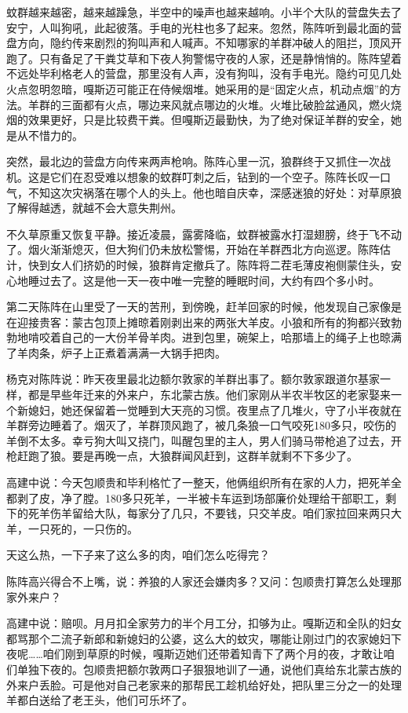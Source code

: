 \par 蚊群越来越密，越来越躁急，半空中的噪声也越来越响。小半个大队的营盘失去了安宁，人叫狗吼，此起彼落。手电的光柱也多了起来。忽然，陈阵听到最北面的营盘方向，隐约传来剧烈的狗叫声和人喊声。不知哪家的羊群冲破人的阻拦，顶风开跑了。只有备足了干粪艾草和下夜人狗警惕守夜的人家，还是静悄悄的。陈阵望着不远处毕利格老人的营盘，那里没有人声，没有狗叫，没有手电光。隐约可见几处火点忽明忽暗，嘎斯迈可能正在侍候烟堆。她采用的是“固定火点，机动点烟”的方法。羊群的三面都有火点，哪边来风就点哪边的火堆。火堆比破脸盆通风，燃火烧烟的效果更好，只是比较费干粪。但嘎斯迈最勤快，为了绝对保证羊群的安全，她是从不惜力的。
\par 突然，最北边的营盘方向传来两声枪响。陈阵心里一沉，狼群终于又抓住一次战机。这是它们在忍受难以想象的蚊群叮刺之后，钻到的一个空子。陈阵长叹一口气，不知这次灾祸落在哪个人的头上。他也暗自庆幸，深感迷狼的好处：对草原狼了解得越透，就越不会大意失荆州。
\par 不久草原重又恢复平静。接近凌晨，露雾降临，蚊群被露水打湿翅膀，终于飞不动了。烟火渐渐熄灭，但大狗们仍未放松警惕，开始在羊群西北方向巡逻。陈阵估计，快到女人们挤奶的时候，狼群肯定撤兵了。陈阵将二茬毛薄皮袍侧蒙住头，安心地睡过去了。这是他一天一夜中唯一完整的睡眠时间，大约有四个多小时。
\par 
\par 第二天陈阵在山里受了一天的苦刑，到傍晚，赶羊回家的时候，他发现自己家像是在迎接贵客：蒙古包顶上摊晾着刚剥出来的两张大羊皮。小狼和所有的狗都兴致勃勃地啃咬着自己的一大份羊骨羊肉。进到包里，碗架上，哈那墙上的绳子上也晾满了羊肉条，炉子上正煮着满满一大锅手把肉。
\par 杨克对陈阵说：昨天夜里最北边额尔敦家的羊群出事了。额尔敦家跟道尔基家一样，都是早些年迁来的外来户，东北蒙古族。他们家刚从半农半牧区的老家娶来一个新媳妇，她还保留着一觉睡到大天亮的习惯。夜里点了几堆火，守了小半夜就在羊群旁边睡着了。烟灭了，羊群顶风跑了，被几条狼一口气咬死180多只，咬伤的羊倒不太多。幸亏狗大叫又挠门，叫醒包里的主人，男人们骑马带枪追了过去，开枪赶跑了狼。要是再晚一点，大狼群闻风赶到，这群羊就剩不下多少了。
\par 高建中说：今天包顺贵和毕利格忙了一整天，他俩组织所有在家的人力，把死羊全都剥了皮，净了膛。180多只死羊，一半被卡车运到场部廉价处理给干部职工，剩下的死羊伤羊留给大队，每家分了几只，不要钱，只交羊皮。咱们家拉回来两只大羊，一只死的，一只伤的。
\par 天这么热，一下子来了这么多的肉，咱们怎么吃得完？
\par 陈阵高兴得合不上嘴，说：养狼的人家还会嫌肉多？又问：包顺贵打算怎么处理那家外来户？
\par 高建中说：赔呗。月月扣全家劳力的半个月工分，扣够为止。嘎斯迈和全队的妇女都骂那个二流子新郎和新媳妇的公婆，这么大的蚊灾，哪能让刚过门的农家媳妇下夜呢……咱们刚到草原的时候，嘎斯迈她们还带着知青下了两个月的夜，才敢让咱们单独下夜的。包顺贵把额尔敦两口子狠狠地训了一通，说他们真给东北蒙古族的外来户丢脸。可是他对自己老家来的那帮民工趁机给好处，把队里三分之一的处理羊都白送给了老王头，他们可乐坏了。
